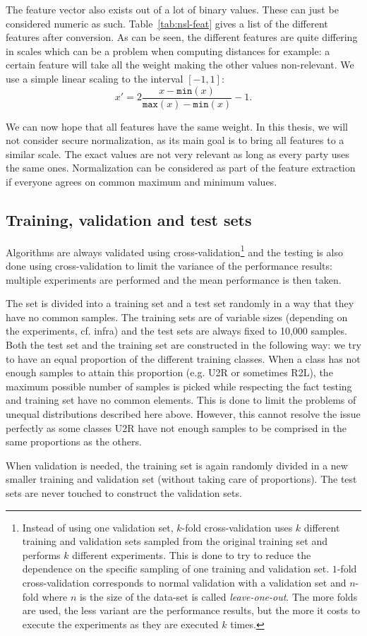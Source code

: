 The feature vector also exists out of a lot of binary values. These can just be considered numeric as such. Table~\ref{tab:nsl-feat} gives a list of the different features after conversion. As can be seen, the different features are quite differing in scales which can be a problem when computing distances for example: a certain feature will take all the weight making the other values non-relevant. We use a simple linear scaling to the interval $\left[-1,1\right]$:
\begin{equation}
    x' = 2\frac{x-\mathtt{min}(x)}{\mathtt{max}(x)-\mathtt{min}(x)}-1.
\end{equation}

We can now hope that all features have the same weight. In this thesis, we will not consider secure normalization, as its main goal is to bring all features to a similar scale. The exact values are not very relevant as long as every party uses the same ones. Normalization can be considered as part of the feature extraction if everyone agrees on common maximum and minimum values.


\subsection{Training, validation and test sets}
\label{sec:dataset-bagging}
Algorithms are always validated using cross-validation\footnote{Instead of using one validation set, $k$-fold cross-validation uses $k$ different training and validation sets sampled from the original training set and performs $k$ different experiments. This is done to try to reduce the dependence on the specific sampling of one training and validation set. $1$-fold cross-validation corresponds to normal validation with a validation set and $n$-fold where $n$ is the size of the data-set is called \emph{leave-one-out}. The more folds are used, the less variant are the performance results, but the more it costs to execute the experiments as they are executed $k$ times.} and the testing is also done using cross-validation to limit the variance of the performance results: multiple experiments are performed and the mean performance is then taken.

The set is divided into a training set and a test set randomly in a way that they have no common samples. The training sets are of variable sizes (depending on the experiments, cf. infra) and the test sets are always fixed to 10,000 samples. Both the test set and the training set are constructed in the following way: we try to have an equal proportion of the different training classes. When a class has not enough samples to attain this proportion (e.g. U2R or sometimes R2L), the maximum possible number of samples is picked while respecting the fact testing and training set have no common elements. This is done to limit the problems of unequal distributions described here above. However, this cannot resolve the issue perfectly as some classes U2R have not enough samples to be comprised in the same proportions as the others.

When validation is needed, the training set is again randomly divided in a new smaller training and validation set (without taking care of proportions). The test sets are never touched to construct the validation sets.